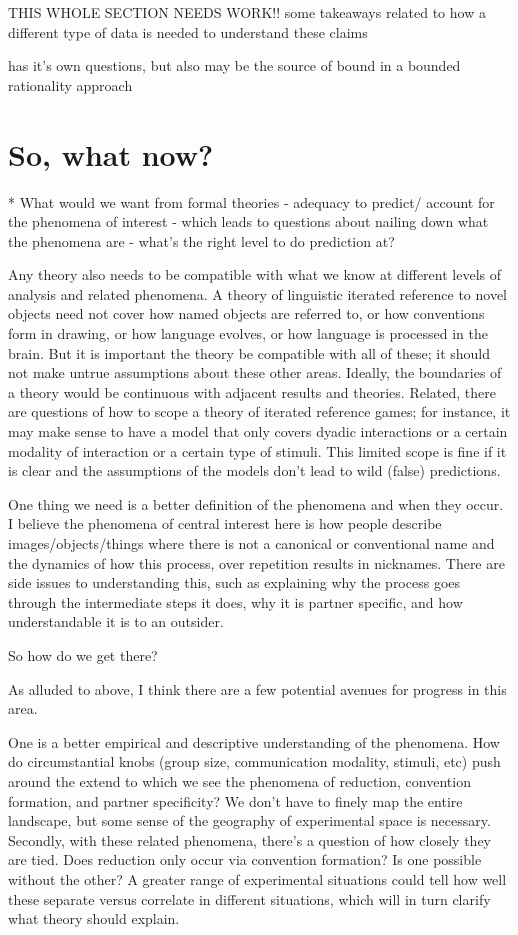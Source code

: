 \documentclass[]{article}
\begin{document}
THIS WHOLE SECTION NEEDS WORK!!
some takeaways related to how a different type of data is needed to understand these claims

has it's own questions, but also may be the  source of bound in a bounded rationality approach 

	\section{So, what now?}
	
	* What would we want from formal theories
	- adequacy to predict/ account for the phenomena of interest
	  - which leads to questions about nailing down what the phenomena are
	- what's the right level to do prediction at?

Any theory also needs to be compatible with what we know at different levels of analysis and related phenomena. A theory of linguistic iterated reference to novel objects need not cover how named objects are referred to, or how conventions form in drawing, or how language evolves, or how language is processed in the brain. But it is important the theory be compatible with all of these; it should not make untrue assumptions about these other areas. Ideally, the boundaries of a theory would be continuous with adjacent results and theories. 
Related, there are questions of how to scope a theory of iterated reference games; for instance, it may make sense to have a model that only covers dyadic interactions or a certain modality of interaction or a certain type of stimuli. This limited scope is fine if it is clear and the assumptions of the models don't lead to wild (false) predictions. 
	
	One thing we need is a better definition of the phenomena and when they occur. I believe the phenomena of central interest here is how people describe images/objects/things where there is not a canonical or conventional name and the dynamics of how this process, over repetition results in nicknames. There are side issues to understanding this, such as explaining why the process goes through the intermediate steps it does, why it is partner specific, and how understandable it is to an outsider. 
	
	So how do we get there?
	
	As alluded to above, I think there are a few potential avenues for progress in this area. 
	
	One is a better empirical and descriptive understanding of the phenomena. How do circumstantial knobs (group size, communication modality, stimuli, etc) push around the extend to which we see the phenomena of reduction, convention formation, and partner specificity? We don't have to finely map the entire landscape, but some sense of the geography of experimental space is necessary. Secondly, with these related phenomena, there's a question of how closely they are tied. Does reduction only occur via convention formation? Is one possible without the other? A greater range of experimental situations could tell how well these separate versus correlate in different situations, which will in turn clarify what theory should explain. 
	
\end{document}
